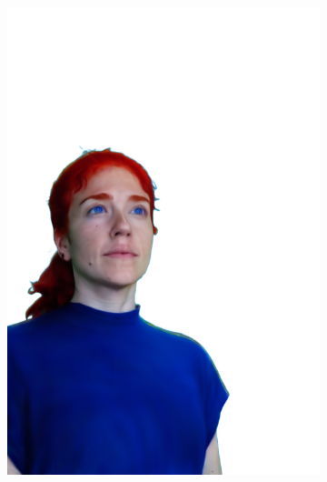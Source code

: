 \begin{figure}[ht]
\begin{subfigure}{0.08\linewidth}
        \includegraphics[width=\textwidth]{Figures/results/low/irene_red/11_render.png}

\end{subfigure}
\end{figure}
